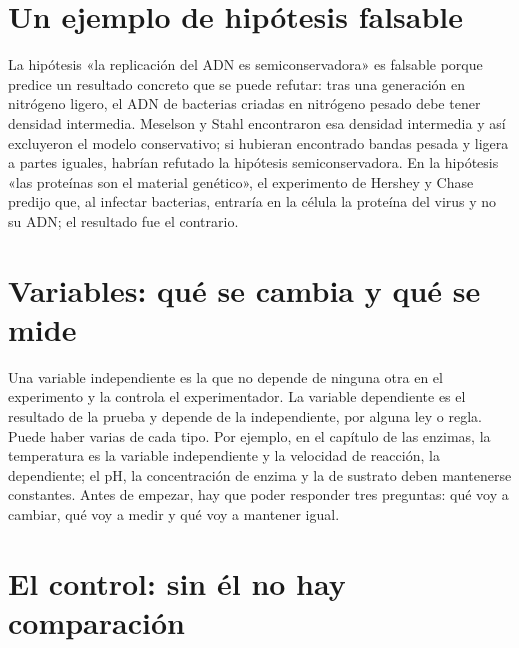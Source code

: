 \documentclass{book}
\begin{document}

\section{Un ejemplo de hipótesis falsable}

La hipótesis «la replicación del ADN es semiconservadora» es falsable porque predice un resultado concreto que se puede refutar: tras una generación en nitrógeno ligero, el ADN de bacterias criadas en nitrógeno pesado debe tener densidad intermedia. Meselson y Stahl encontraron esa densidad intermedia y así excluyeron el modelo conservativo; si hubieran encontrado bandas pesada y ligera a partes iguales, habrían refutado la hipótesis semiconservadora. En la hipótesis «las proteínas son el material genético», el experimento de Hershey y Chase predijo que, al infectar bacterias, entraría en la célula la proteína del virus y no su ADN; el resultado fue el contrario.


\section{Variables: qué se cambia y qué se mide}

Una variable independiente es la que no depende de ninguna otra en el experimento y la controla el experimentador. La variable dependiente es el resultado de la prueba y depende de la independiente, por alguna ley o regla. Puede haber varias de cada tipo. Por ejemplo, en el capítulo de las enzimas, la temperatura es la variable independiente y la velocidad de reacción, la dependiente; el pH, la concentración de enzima y la de sustrato deben mantenerse constantes. Antes de empezar, hay que poder responder tres preguntas: qué voy a cambiar, qué voy a medir y qué voy a mantener igual.


\section{El control: sin él no hay comparación}
\end{document}
